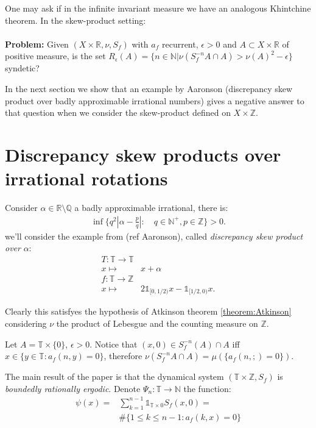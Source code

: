 \documentclass{article}
\begin{document}
One may ask if in the infinite invariant measure we have an
analogous Khintchine theorem. In the skew-product
setting:
\paragraph{}
\textbf{Problem:} Given $(X\times \mathbb{R}, \nu,S_f)$ with $a_f$
recurrent, $\epsilon>0$ and $A\subset X\times \mathbb{R}$ of positive
measure, is the set $R_\epsilon(A)=\{n\in \mathbb{N}|\nu(S_f^{-n}
A\cap A)>\nu(A)^2-\epsilon\}$ syndetic?

In the next section we show that an example by Aaronson (discrepancy 
skew product over badly approximable irrational numbers) gives a negative
answer to that question when we consider the skew-product defined on 
$X\times\mathbb{Z}$. 


\section{Discrepancy skew products over irrational rotations}


Consider $\alpha\in \mathbb{R}\setminus \mathbb{Q}$
a badly approximable irrational, there is:
\begin{align*}
    \inf\{q^2|\alpha-\frac{p}{q}| :\quad q\in\mathbb{N}^+, p\in \mathbb{Z}\}>0.
\end{align*}
we'll consider the example from  (ref Aaronson), called \textit{discrepancy
skew product over} $\alpha$:
\begin{align*}
T:\mathbb{T}\to \mathbb{T}&\\
 x\mapsto & x+\alpha \\
f:\mathbb{T}\to \mathbb{Z}&\\
x\mapsto & 2\mathds{1}_{[0,1/2)}x-\mathds{1}_{[1/2,0)}x.
\end{align*}

Clearly this satisfyes the hypothesis of Atkinson theorem \ref{theorem:Atkinson}
considering $\nu$ the product of Lebesgue and the counting measure on $\mathbb{Z}$.

Let $A=\mathbb{T}\times \{0\}$, $\epsilon>0$. Notice that $(x,0)
\in S_f^{-n}(A)\cap A$ iff $x\in \{y\in \mathbb{T}: a_f(n,y)=0\}$, 
therefore $\nu(S_f^{-n}A\cap A)=\mu(\{a_f(n,;)=0\})$.


The main result of the paper is that the dynamical system 
$(\mathbb{T}\times \mathbb{Z},S_f)$ is \textit{boundedly rationally ergodic}.
Denote $\Psi_n: \mathbb{T}\to \mathbb{N}$ the function:
\begin{align}
    \psi(x)=&\sum_{k=1}^{n-1} \mathds{1}_{\mathbb{T}\times{0}} S_f(x,0)=\\
    & \#\{1\leq k\leq n-1: a_f(k,x)=0\}
\end{align}
\end{document}
